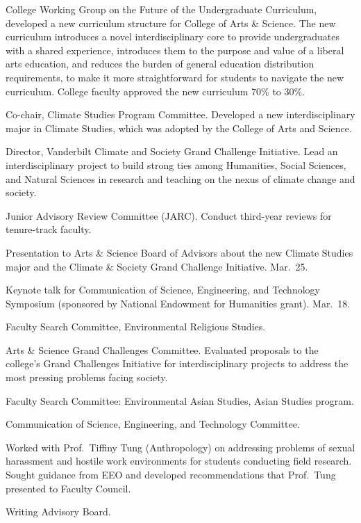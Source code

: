 \item[2022--2023] College Working Group on the Future of the
  Undergraduate Curriculum,
  developed a new curriculum structure for College of Arts \& Science.
  The new curriculum introduces a novel interdisciplinary core to provide undergraduates with a shared experience, introduces them to the purpose and value of a liberal arts education, and reduces the burden of general education distribution requirements, to make it more straightforward for students to navigate the new curriculum.
  College faculty approved the new curriculum 70\% to 30\%.
\item[2021--2023] Co-chair, Climate Studies Program Committee.
  Developed a new interdisciplinary major in Climate Studies, which was adopted
  by the College of Arts and Science.
\item[2020--2023] Director, Vanderbilt Climate and Society Grand Challenge
  Initiative. Lead an interdisciplinary project to build strong ties among
  Humanities, Social Sciences, and Natural Sciences in research and teaching on
  the nexus of climate change and society.
\item[2020--2022] Junior Advisory Review Committee (JARC).
  Conduct third-year reviews for tenure-track faculty.
\item[2022] Presentation to Arts \& Science Board of Advisors about the new
  Climate Studies major and the Climate \& Society Grand Challenge Initiative.
  Mar.~25.
\item[2022] Keynote talk for Communication of Science, Engineering, and
  Technology Symposium (sponsored by National Endowment for Humanities grant).
  Mar.~18.
\item[2021--2022] Faculty Search Committee, Environmental Religious Studies.
\item[2019--2020] Arts \& Science Grand Challenges Committee.
  Evaluated proposals to the college's Grand Challenges Initiative for
  interdisciplinary projects to address the most pressing problems facing
  society.
\item[2019--2020] Faculty Search Committee: Environmental Asian Studies, Asian Studies program.
\item[2003--2018] Communication of Science, Engineering, and Technology Committee.
\item[2014--2015] Worked with Prof.\ Tiffiny Tung (Anthropology) on addressing problems of sexual harassment and hostile work environments for students conducting field research. Sought guidance from EEO and developed recommendations that Prof.\ Tung presented to Faculty Council.
\item[2004--2009] Writing Advisory Board.
